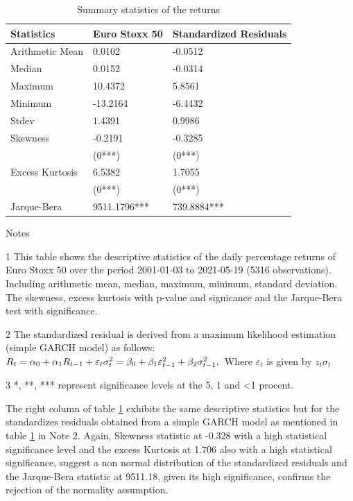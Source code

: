 \documentclass[a4paper, nobind]{templates/ociamthesis}
\begin{document}
\begin{table}[h!]

\caption{\label{tab:dsTable}Summary statistics of the returns}
\centering
\begin{threeparttable}
\begin{tabular}[t]{lll}
\toprule
Statistics & Euro Stoxx 50 & Standardized Residuals\\
\midrule
Arithmetic Mean & 0.0102 & -0.0512\\
Median & 0.0152 & -0.0314\\
Maximum & 10.4372 & 5.8561\\
Minimum & -13.2164 & -6.4432\\
Stdev & 1.4391 & 0.9986\\
\addlinespace
Skewness & -0.2191 & -0.3285\\
 & (0***) & (0***)\\
Excess Kurtosis & 6.5382 & 1.7055\\
 & (0***) & (0***)\\
Jarque-Bera & 9511.1796*** & 739.8884***\\
\bottomrule
\end{tabular}
\begin{tablenotes}
\item Notes
\item[1] This table shows the descriptive statistics of the daily percentage returns of Euro Stoxx 50 over the period 2001-01-03 to 2021-05-19 (5316 observations). Including arithmetic mean, median, maximum, minimum, standard deviation. The skewness, excess kurtosis with p-value and signicance and the Jarque-Bera test with significance.
\item[2] The standardized residual is derived from a maximum likelihood estimation (simple GARCH model) as follows:  $ R_t=\alpha_0+\alpha_1 R_{t-1}+ \varepsilon_t \\ \sigma_t^2=\beta_0+\beta_1 \varepsilon_{t-1}^2+\beta_2 \sigma_{t-1}^2, \\$ Where $\varepsilon_t$ is given by $z_t \sigma_t$
\item[3] *, **, *** represent significance levels at the 5, 1 and <1 procent.
\end{tablenotes}
\end{threeparttable}
\end{table}

\noindent The right column of table \ref{tab:dsTable} exhibits the same descriptive statistics but for the standardizes residuals obtained from a simple GARCH model as mentioned in table \ref{tab:dsTable} in Note 2. Again, Skewness statistic at -0.328 with a high statistical significance level and the excess Kurtosis at 1.706 also with a high statistical significance, suggest a non normal distribution of the standardized residuals and the Jarque-Bera statistic at 9511.18, given its high significance, confirms the rejection of the normality assumption.~\\
\end{document}
